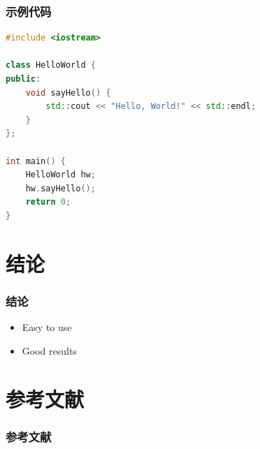 \documentclass[10pt,aspectratio=169,mathserif]{beamer}
\begin{document}
\begin{frame}[fragile]
\frametitle{示例代码}
\begin{lstlisting}[language=C++]
#include <iostream>

class HelloWorld {
public:
    void sayHello() {
        std::cout << "Hello, World!" << std::endl;
    }
};

int main() {
    HelloWorld hw;
    hw.sayHello();
    return 0;
}
\end{lstlisting}
\end{frame}

\section{结论}
\begin{frame}
	\frametitle{结论}

	\begin{itemize}
		\item Easy to use
		\item Good results
	\end{itemize}
\end{frame}

\section{参考文献}
\begin{frame}[allowframebreaks]%
    \frametitle{参考文献}
\end{frame}
\end{document}

